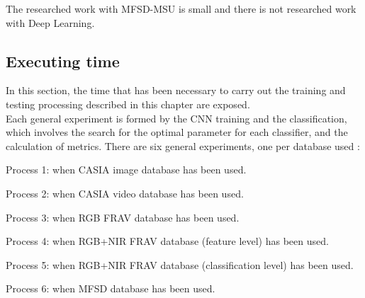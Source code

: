 \begin{table}[]
\centering
{}
\caption{Comparative among proposed models and literature work.}
\label{table_literature_comp}
\end{table}

The researched work with MFSD-MSU is small and there is not researched work with Deep Learning.

\subsection{Executing time}
In this section, the time that has been necessary to carry out the training and testing processing described in this chapter are exposed.\\

Each general experiment is formed by the CNN training and the classification, which involves the search for the optimal parameter for each classifier, and the calculation of metrics. There are six general experiments, one per database used :
\begin{description}[itemsep=2pt,topsep=8pt,parsep=0pt,partopsep=20pt]
 \item Process 1: when CASIA image database has been used.
 \item Process 2: when CASIA video database has been used.
 \item Process 3: when RGB FRAV database has been used.
 \item Process 4: when RGB+NIR FRAV database (feature level) has been used.
 \item Process 5: when RGB+NIR FRAV database (classification level) has been used.
 \item Process 6: when MFSD database has been used.
\end{description}

